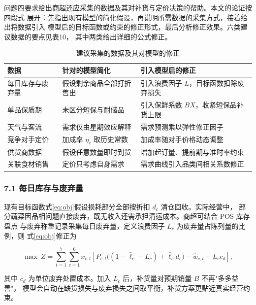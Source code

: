 
问题四要求给出商超还应采集的数据及其对补货与定价决策的帮助。本文的论证按四段式
展开：先指出现有模型的简化假设，再说明所需数据的采集方式，接着给出将数据引入
模型后的目标函数或约束的修正形式，最后分析修正效果。六类建议数据的要点见表10，
其中两类给出详细的公式修正。

\begin{table}[H]
\centering
\caption{建议采集的数据及其对模型的修正}
\label{tab:q4data}
\small
\begin{tabular}{p{2.6cm}p{4.2cm}p{4.6cm}}
\toprule
数据 & 针对的模型简化 & 引入模型后的修正 \\
\midrule
每日库存与废弃量 & 假设剩余商品全部打折售出 & 引入浪费因子 $L$，目标函数扣除废弃损失 \\
单品保质期 & 未区分短保与耐储品 & 引入保鲜系数 $BX$，收紧短保品补货上限 \\
天气与客流 & 需求仅由星期效应解释 & 需求预测乘以弹性修正因子 \\
竞争对手定价 & 加成率 $\eta_c$ 取历史常数 & 加成率随对手价格动态调整 \\
供货商数据 & 假设任意数量即时到货 & 增加起订量、提前期与准时率约束 \\
关联食材销售 & 定价只考虑自身需求 & 需求曲线引入品类间相关系数修正 \\
\bottomrule
\end{tabular}
\end{table}

\subsubsection{7.1 每日库存与废弃量}

现有目标函数式\eqref{eq:obj}假设损耗部分全部按折扣 $d_c$ 清仓回收。实际经营中，
部分蔬菜因品相问题直接废弃，既无收入还需承担清运成本。商超可结合 POS 库存盘点
与废弃称重记录采集每日废弃量，定义浪费因子 $L_c$ 为废弃量占陈列量的比例，则
式\eqref{eq:obj}修正为

\begin{equation}
\max\ Z=\sum_{t=1}^{7}\sum_{c=1}^{6}x_{c,t}\left[P_{c,t}\bigl((1-\bar\ell_c-L_c)+\bar\ell_c d_c\bigr)-\hat w_{c,t}-L_c c_d\right],
\label{eq:q4_waste}
\end{equation}

其中 $c_d$ 为单位废弃处置成本。加入 $L_c$ 后，补货量对预期销量 $B$ 不再"多多益善"，
模型会自动在缺货损失与废弃损失之间取平衡，补货方案更贴近真实经营约束。

